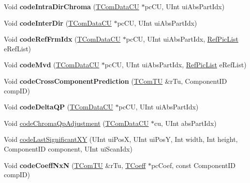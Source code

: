 \begin{DoxyCompactItemize}
Void {\bfseries code\+Intra\+Dir\+Chroma} (\hyperlink{class_t_com_data_c_u}{T\+Com\+Data\+CU} $\ast$pc\+CU, U\+Int ui\+Abs\+Part\+Idx)
\item 
\mbox{\label{class_t_enc_sbac_a219a1bb01a5fd162963a31cd54c19737}} 
Void {\bfseries code\+Inter\+Dir} (\hyperlink{class_t_com_data_c_u}{T\+Com\+Data\+CU} $\ast$pc\+CU, U\+Int ui\+Abs\+Part\+Idx)
\item 
\mbox{\label{class_t_enc_sbac_a8341277bb433a038759abde486c45f92}} 
Void {\bfseries code\+Ref\+Frm\+Idx} (\hyperlink{class_t_com_data_c_u}{T\+Com\+Data\+CU} $\ast$pc\+CU, U\+Int ui\+Abs\+Part\+Idx, \hyperlink{_type_def_8h_a93cea48eb9dcfd661168dee82e41b384}{Ref\+Pic\+List} e\+Ref\+List)
\item 
\mbox{\label{class_t_enc_sbac_a94376e7172a51bcb9836d3be7a6a8763}} 
Void {\bfseries code\+Mvd} (\hyperlink{class_t_com_data_c_u}{T\+Com\+Data\+CU} $\ast$pc\+CU, U\+Int ui\+Abs\+Part\+Idx, \hyperlink{_type_def_8h_a93cea48eb9dcfd661168dee82e41b384}{Ref\+Pic\+List} e\+Ref\+List)
\item 
\mbox{\label{class_t_enc_sbac_a63eca5186c254c7b47a13fd6608f888c}} 
Void {\bfseries code\+Cross\+Component\+Prediction} (\hyperlink{class_t_com_t_u}{T\+Com\+TU} \&r\+Tu, Component\+ID comp\+ID)
\item 
\mbox{\label{class_t_enc_sbac_a6b1d3adb687e6e4915efcd9e09480dba}} 
Void {\bfseries code\+Delta\+QP} (\hyperlink{class_t_com_data_c_u}{T\+Com\+Data\+CU} $\ast$pc\+CU, U\+Int ui\+Abs\+Part\+Idx)
\item 
Void \hyperlink{class_t_enc_sbac_a2bfc5581dab9d69768065390da483e07}{code\+Chroma\+Qp\+Adjustment} (\hyperlink{class_t_com_data_c_u}{T\+Com\+Data\+CU} $\ast$cu, U\+Int abs\+Part\+Idx)
\item 
Void \hyperlink{class_t_enc_sbac_ac014baa389c6b2e94e4574bdda6caba9}{code\+Last\+Significant\+XY} (U\+Int ui\+PosX, U\+Int ui\+PosY, Int width, Int height, Component\+ID component, U\+Int ui\+Scan\+Idx)
\item 
\mbox{\label{class_t_enc_sbac_a440ba8d75a479f372fcfd35c0480e032}} 
Void {\bfseries code\+Coeff\+NxN} (\hyperlink{class_t_com_t_u}{T\+Com\+TU} \&r\+Tu, \hyperlink{_type_def_8h_a5bdd3b17d14ed1978c366d2d958c0300}{T\+Coeff} $\ast$pc\+Coef, const Component\+ID comp\+ID)

\end{DoxyCompactItemize}
